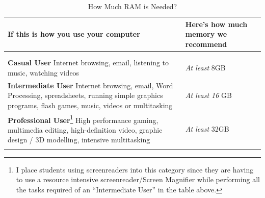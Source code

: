 \documentclass[14pt,letterpaper,twoside]{extreport}
\begin{document}
\begin{longtable}[]{@{}>{\raggedright\arraybackslash}m{}>{\raggedright\arraybackslash}m{}@{}}
	\toprule\noalign{}

	\textbf{If this is how you use your computer}                                                                                                                                                                                                                                                                                                                                                         & \textbf{Here's how much memory we recommend} \\
	\midrule\noalign{}
	\endhead \hline                                                                                                                                                                                                                                                                                                                                                                                                                                      \\
	\multicolumn{2}{r}{\textbf{Continued on Next Page}}                                                                                                                                                                                                                                                                                                                                                                                                  \\
	\endfoot

	\endlastfoot
	\textbf{Casual User} \break Internet browsing, email, listening to music, watching videos                                                                                                                                                                                                                                                                                                             & \emph{At least} 8GB                          \\[2.5em]
	\textbf{Intermediate User} \break Internet browsing, email, Word Processing, spreadsheets, running simple graphics programs, flash games, music, videos or multitasking                                                                                                                                                                                                                               & \emph{At least 16} GB                        \\[2.5em]
	\textbf{Professional User}\footnote{I place students using screenreaders into this category since they are having to use a resource intensive screenreader/Screen Magnifier while performing all the tasks required of an ``Intermediate User'' in the table above.} \break High performance gaming, multimedia editing, high-definition video, graphic design / 3D modelling, intensive multitasking & \emph{At least} 32GB                         \\[2.5em] \hline
	\caption{How Much RAM is Needed?}
\end{longtable}
\end{document}
